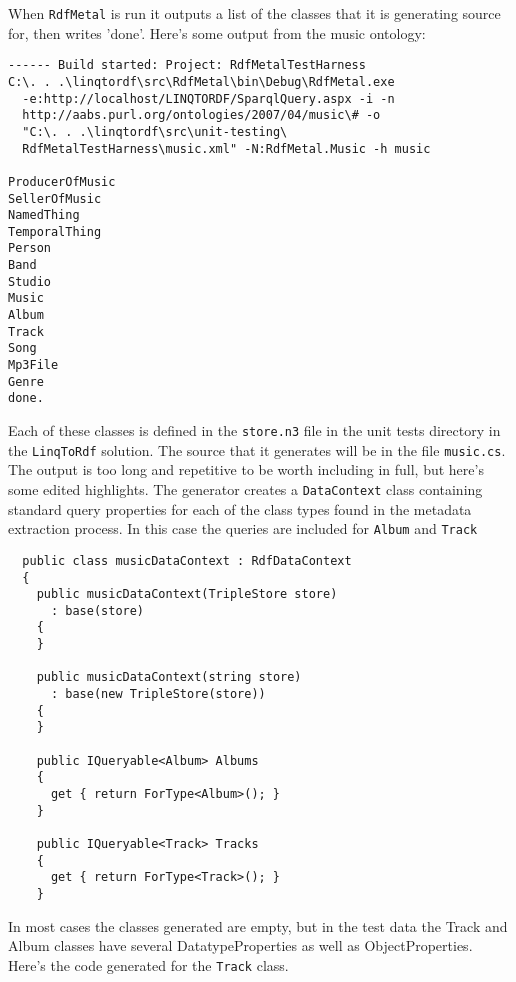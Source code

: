 \documentclass{article}
\def\rm{\texttt{RdfMetal}}
\def\l2r{\texttt{LinqToRdf}}
\begin{document}
When \rm{} is run it outputs a list of the classes that it is generating source
for, then writes 'done'. Here's some output from the music ontology:

\begin{verbatim}
------ Build started: Project: RdfMetalTestHarness
C:\. . .\linqtordf\src\RdfMetal\bin\Debug\RdfMetal.exe
  -e:http://localhost/LINQTORDF/SparqlQuery.aspx -i -n
  http://aabs.purl.org/ontologies/2007/04/music\# -o
  "C:\. . .\linqtordf\src\unit-testing\
  RdfMetalTestHarness\music.xml" -N:RdfMetal.Music -h music

ProducerOfMusic
SellerOfMusic
NamedThing
TemporalThing
Person
Band
Studio
Music
Album
Track
Song
Mp3File
Genre
done.
\end{verbatim}

Each of these classes is defined in the \texttt{store.n3} file in the unit tests
directory in the \l2r{} solution. The source that it generates will be in the
file \texttt{music.cs}. The output is too long and repetitive to be worth including in
full, but here's some edited highlights. The generator creates a \texttt{DataContext}
class containing standard query properties for each of the class types found in
the metadata extraction process. In this case the queries are included for
\texttt{Album} and \texttt{Track} 

\begin{verbatim}
  public class musicDataContext : RdfDataContext
  {
    public musicDataContext(TripleStore store)
      : base(store)
    {
    }

    public musicDataContext(string store)
      : base(new TripleStore(store))
    {
    }

    public IQueryable<Album> Albums
    {
      get { return ForType<Album>(); }
    }

    public IQueryable<Track> Tracks
    {
      get { return ForType<Track>(); }
    }

\end{verbatim}

In most cases the classes generated are empty, but in the test data the Track
and Album classes have several DatatypeProperties as well as ObjectProperties.
Here's the code generated for the \texttt{Track} class.
\end{document}
